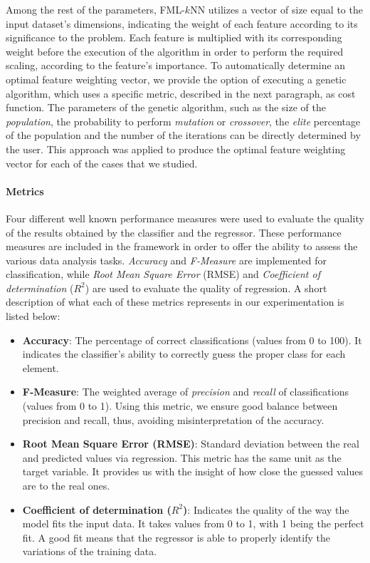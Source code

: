 Among the rest of the parameters, FML-$k$NN utilizes a vector of size equal to the input dataset's dimensions, indicating the weight of each feature according to its significance to the problem. Each feature is multiplied with its corresponding weight before the execution of the algorithm in order to perform the required scaling, according to the feature's importance. To automatically determine an optimal feature weighting vector, we provide the option of executing a genetic algorithm, which uses a specific metric, described in the next paragraph, as cost function. The parameters of the genetic algorithm, such as the size of the \textit{population}, the probability to perform \textit{mutation} or \textit{crossover}, the \textit{elite} percentage of the population and the number of the iterations can be directly determined by the user. This approach was applied to produce the optimal feature weighting vector for each of the cases that we studied.

\paragraph{Metrics}
\label{par:metrics}
Four different well known performance measures were used to evaluate the quality of the results obtained by the classifier and the regressor. These performance measures are included in the framework in order to offer the ability to assess the various data analysis tasks. \textit{Accuracy} and \textit{F-Measure} are implemented for classification, while \textit{Root Mean Square Error} (RMSE) and \textit{Coefficient of determination} ($R^2$) are used to evaluate the quality of regression. A short description of what each of these metrics represents in our experimentation is listed below:

\begin{itemize}
\item \textbf{Accuracy}: The percentage of correct classifications (values from 0 to 100). It indicates the classifier's ability to correctly guess the proper class for each element.
\item \textbf{F-Measure}: The weighted average of \textit{precision} and \textit{recall} of classifications (values from 0 to 1). Using this metric, we ensure good balance between precision and recall, thus, avoiding misinterpretation of the accuracy.
\item \textbf{Root Mean Square Error (RMSE)}: Standard deviation between the real and predicted values via regression. This metric has the same unit as the target variable. It provides us with the insight of how close the guessed values are to the real ones.
\item \textbf{Coefficient of determination ($R^2$)}: Indicates the quality of the way the model fits the input data. It takes values from 0 to 1, with 1 being the perfect fit. A good fit means that the regressor is able to properly identify the variations of the training data.
\end{itemize}

